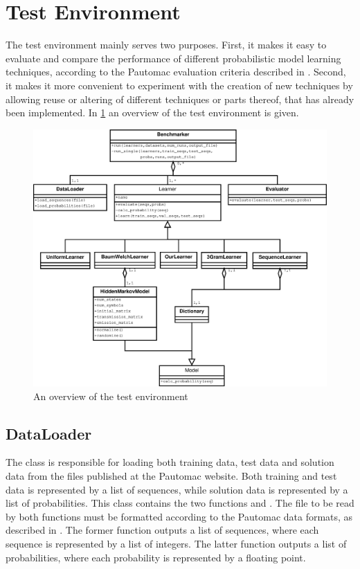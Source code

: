 \section{Test Environment}

The test environment mainly serves two purposes. First, it makes it easy to evaluate and compare the performance of different probabilistic model learning techniques, according to the Pautomac evaluation criteria described in .
Second, it makes it more convenient to experiment with the creation of new techniques by allowing reuse or altering of different techniques or parts thereof, that has already been implemented. In \ref{fig:testenvironment} an overview of the test environment is given.

\begin{figure}[!htb]
\centering
\includegraphics[scale=.4]{pictures/test-environment-overview.eps}
\caption{An overview of the test environment}
\label{fig:testenvironment}
\end{figure}

\subsection{DataLoader}
The  class is responsible for loading both training data, test data and solution data from the files published at the Pautomac website. Both training and test data is represented by a list of sequences, while solution data is represented by a list of probabilities.
This class contains the two functions  and . The file to be read by both functions must be formatted according to the Pautomac data formats, as described in . The former function outputs a list of sequences, where each sequence is represented by a list of integers.
The latter function outputs a list of probabilities, where each probability is represented by a floating point.

